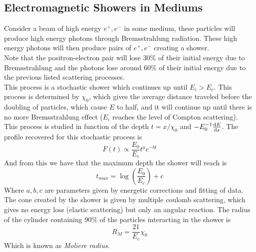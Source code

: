 \documentclass[../qm.tex]{subfiles}
\begin{document}
\subsection{Electromagnetic Showers in Mediums}
Consider a beam of high energy $e^+,e^-$ in some medium, these particles will produce high energy photons through Bremsstrahlung radiation. These high energy photons will then produce pairs of $e^+,e^-$ creating a shower.\\
Note that the positron-electron pair will lose $30\%$ of their initial energy due to Bremsstrahlung and the photons lose around $60\%$ of their initial energy due to the previous listed scattering processes.\\
This process is a stochastic shower which continues up until $E_i>E_c$. This process is determined by $\chi_0$, which gives the average distance traveled before the doubling of particles, which cause $E$ to half, and it will continue up until there is no more Bremsstrahlung effect ($E_i$ reaches the level of Compton scattering).\\
This process is studied in function of the depth $t=x/\chi_0$ and $-E_0^{-1}\dv{E}{x}$. The profile recovered for this stochastic process is
\begin{equation}
	F(t)\propto\frac{E_0}{E_c}t^ae^{-bt}
	\label{eq:emshowerprofile}
\end{equation}
And from this we have that the maximum depth the shower will reach is
\begin{equation}
	t_{max}=\log\left( \frac{E_0}{E_c} \right)+c
	\label{eq:maxdepthshower}
\end{equation}
Where $a,b,c$ are parameters given by energetic corrections and fitting of data.\\
The cone created by the shower is given by multiple coulomb scattering, which gives no energy loss (elastic scattering) but only an angular reaction. The radius of the cylinder containing $90\%$ of the particles interacting in the shower is
\begin{equation}
	R_M=\frac{21}{E_c}\chi_0
	\label{eq:moliereradius}
\end{equation}
Which is known as \emph{Moliere radius}.
\end{document}
